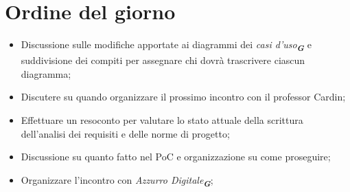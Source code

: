 

\section{Ordine del giorno}

\begin{itemize}
    \item Discussione sulle modifiche apportate ai diagrammi dei \emph{casi d'uso}\textsubscript{\textit{\textbf{G}}} e suddivisione dei compiti per assegnare chi dovrà trascrivere ciascun diagramma;   
    \item Discutere su quando organizzare il prossimo incontro con il professor Cardin;
    \item Effettuare un resoconto per valutare lo stato attuale della scrittura dell'analisi dei requisiti e delle norme di progetto;
    \item Discussione su quanto fatto nel PoC e organizzazione su come proseguire;
    \item Organizzare l'incontro con \emph{Azzurro Digitale}\textsubscript{\textit{\textbf{G}}};
\end{itemize}
